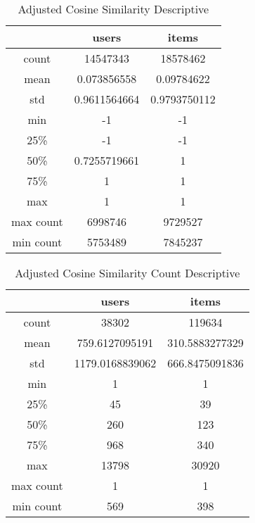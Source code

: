 \begin{table}[H]
\centering
\caption{Adjusted Cosine Similarity Descriptive}
\label{table:adjusted_cosine_similarity_descriptive}
\begin{tabular}{|c|c|c|}
\hline
          & \textbf{users} & \textbf{items} \\ \hline
count     & 14547343       & 18578462       \\ \hline
mean      & 0.073856558    & 0.09784622     \\ \hline
std       & 0.9611564664   & 0.9793750112   \\ \hline
min       & -1             & -1             \\ \hline
25\%      & -1             & -1             \\ \hline
50\%      & 0.7255719661   & 1              \\ \hline
75\%      & 1              & 1              \\ \hline
max       & 1              & 1              \\ \hline
max count & 6998746        & 9729527        \\ \hline
min count & 5753489        & 7845237        \\ \hline
\end{tabular}
\end{table}

\begin{table}[H]
\centering
\caption{Adjusted Cosine Similarity Count Descriptive}
\label{adjusted_cosine_similarity_count_descriptive}
\begin{tabular}{|c|c|c|}
\hline
          & \textbf{users}  & \textbf{items} \\ \hline
count     & 38302           & 119634         \\ \hline
mean      & 759.6127095191  & 310.5883277329 \\ \hline
std       & 1179.0168839062 & 666.8475091836 \\ \hline
min       & 1               & 1              \\ \hline
25\%      & 45              & 39             \\ \hline
50\%      & 260             & 123            \\ \hline
75\%      & 968             & 340            \\ \hline
max       & 13798           & 30920          \\ \hline
max count & 1               & 1              \\ \hline
min count & 569             & 398            \\ \hline
\end{tabular}
\end{table}

